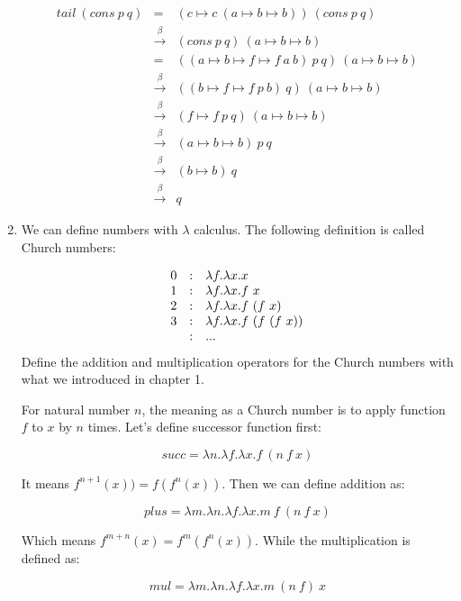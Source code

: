 \documentclass[UTF8]{article}
\begin{document}
\begin{enumerate}
\[
\begin{array}{rcl}
tail\ (cons\ p\ q) & = & (c \mapsto c\ (a \mapsto b \mapsto b))\ (cons\ p\ q) \\
                   & \xrightarrow{\beta} & (cons\ p\ q)\ (a \mapsto b \mapsto b) \\
                   & = & ((a \mapsto b \mapsto f \mapsto f\ a\ b)\ p\ q)\ (a \mapsto b \mapsto b) \\
                   & \xrightarrow{\beta} & ((b \mapsto f \mapsto f\ p\ b)\ q)\ (a \mapsto b \mapsto b) \\
                   & \xrightarrow{\beta} & (f \mapsto f\ p\ q)\ (a \mapsto b \mapsto b) \\
                   & \xrightarrow{\beta} & (a \mapsto b \mapsto b)\ p\ q \\
                   & \xrightarrow{\beta} & (b \mapsto b)\ q \\
                   & \xrightarrow{\beta} & q
\end{array}
\]

\item {We can define numbers with $\lambda$ calculus. The following definition is called Church numbers:

\[
\begin{array}{r@{\quad:\quad}l}
0 & \lambda f . \lambda x . x \\
1 & \lambda f . \lambda x . f\ x \\
2 & \lambda f . \lambda x . f\ (f\ x) \\
3 & \lambda f . \lambda x . f\ (f\ (f\ x)) \\
  & ...
\end{array}
\]
Define the addition and multiplication operators for the Church numbers with what we introduced in chapter 1.
}

For natural number $n$, the meaning as a Church number is to apply function $f$ to $x$ by $n$ times. Let's define successor function first:

\[
succ = \lambda n . \lambda f . \lambda x . f\ (n\ f\ x)
\]

It means $f^{n+1}(x)) = f(f^n(x))$. Then we can define addition as:

\[
plus = \lambda m . \lambda n . \lambda f . \lambda x . m\ f\ (n\ f\ x)
\]

Which means $f^{m + n}(x) = f^m(f^n(x))$. While the multiplication is defined as:

\[
mul = \lambda m . \lambda n . \lambda f . \lambda x . m\ (n\ f)\ x
\]


\end{enumerate}
\end{document}
